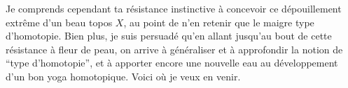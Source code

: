 
Je comprends cependant ta résistance instinctive à concevoir ce dépouillement extrême d'un beau topos $X$, au point de%
n'en retenir que le maigre type d'homotopie. Bien plus, je suis persuadé qu'en%
%
allant jusqu'au bout\unsure{,} de cette résistance à fleur de peau, on arrive à généraliser et à approfondir la notion de ``type d'homotopie'', et à apporter encore une nouvelle eau au développement d'un bon yoga homotopique. Voici où je veux en venir.

